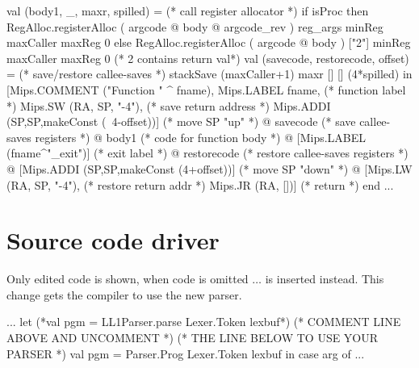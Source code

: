 \documentclass[10pt]{article}
\begin{document}
\begin{fancycode}[frame=lines,fontsize=\scriptsize,label=\textit{edited code - SRC/Compiler.sml}]
          val (body1, _, maxr, spilled) =  (* call register allocator *)
            if isProc then
              RegAlloc.registerAlloc ( argcode @ body @ argcode_rev )
                                     reg_args minReg maxCaller maxReg 0
            else
              RegAlloc.registerAlloc ( argcode @ body )
                                     ["2"] minReg maxCaller maxReg 0
                                     (* 2 contains return val*)
          val (savecode, restorecode, offset) = (* save/restore callee-saves *)
              stackSave (maxCaller+1) maxr [] [] (4*spilled)
        in  [Mips.COMMENT ("Function " ^ fname),
             Mips.LABEL fname,       (* function label *)
             Mips.SW (RA, SP, "-4"), (* save return address *)
             Mips.ADDI (SP,SP,makeConst (~4-offset))] (* move SP "up" *)
          @ savecode                 (* save callee-saves registers *)
          @ body1                    (* code for function body *)
          @ [Mips.LABEL (fname^"_exit")] (* exit label *)
          @ restorecode              (* restore callee-saves registers *)
          @ [Mips.ADDI (SP,SP,makeConst (4+offset))] (* move SP "down" *)
          @ [Mips.LW (RA, SP, "-4"),  (* restore return addr *)
             Mips.JR (RA, [])]       (* return *)
        end
...
\end{fancycode}

\section{Source code driver}
Only edited code is shown, when code is omitted $\ldots$ is inserted instead. This change gets the compiler to use the new parser.
\begin{fancycode}[frame=lines,fontsize=\scriptsize,label=\textit{edited code - SRC/Driver.sml - }]
...
   let
     (*val pgm = LL1Parser.parse Lexer.Token lexbuf*)
     (* COMMENT LINE ABOVE AND UNCOMMENT  *)
     (* THE LINE BELOW TO USE YOUR PARSER *)
     val pgm = Parser.Prog Lexer.Token lexbuf
   in case arg of
...
\end{fancycode}
\end{document}

